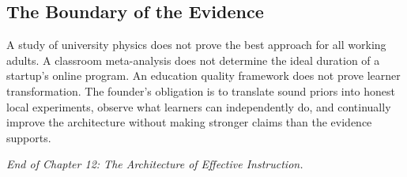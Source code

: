 \subsection*{The Boundary of the Evidence}

A study of university physics does not prove the best approach for all working adults. A classroom meta-analysis does not determine the ideal duration of a startup's online program. An education quality framework does not prove learner transformation. The founder's obligation is to translate sound priors into honest local experiments, observe what learners can independently do, and continually improve the architecture without making stronger claims than the evidence supports.

\vspace{1.5em}
\noindent\emph{End of Chapter 12: The Architecture of Effective Instruction.}
